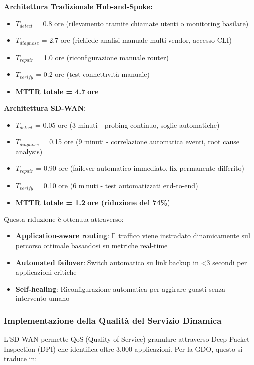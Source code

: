\textbf{Architettura Tradizionale Hub-and-Spoke:}
\begin{itemize}
    \item $T_{detect}$ = 0.8 ore (rilevamento tramite chiamate utenti o monitoring basilare)
    \item $T_{diagnose}$ = 2.7 ore (richiede analisi manuale multi-vendor, accesso CLI)
    \item $T_{repair}$ = 1.0 ore (riconfigurazione manuale router)
    \item $T_{verify}$ = 0.2 ore (test connettività manuale)
    \item \textbf{MTTR totale = 4.7 ore}
\end{itemize}

\textbf{Architettura SD-WAN:}
\begin{itemize}
    \item $T_{detect}$ = 0.05 ore (3 minuti - probing continuo, soglie automatiche)
    \item $T_{diagnose}$ = 0.15 ore (9 minuti - correlazione automatica eventi, root cause analysis)
    \item $T_{repair}$ = 0.90 ore (failover automatico immediato, fix permanente differito)
    \item $T_{verify}$ = 0.10 ore (6 minuti - test automatizzati end-to-end)
    \item \textbf{MTTR totale = 1.2 ore (riduzione del 74\%)}
\end{itemize}

Questa riduzione è ottenuta attraverso:
\begin{itemize}
    \item \textbf{Application-aware routing}: Il traffico viene instradato dinamicamente sul percorso ottimale basandosi su metriche real-time
    \item \textbf{Automated failover}: Switch automatico su link backup in <3 secondi per applicazioni critiche
    \item \textbf{Self-healing}: Riconfigurazione automatica per aggirare guasti senza intervento umano
\end{itemize}

\subsubsection{\texorpdfstring{\textbf{Implementazione della Qualità del Servizio Dinamica}}{3.3.1.3 - Implementazione della Qualità del Servizio Dinamica}}

L'SD-WAN permette QoS (Quality of Service) granulare attraverso Deep Packet Inspection (DPI) che identifica oltre 3.000 applicazioni. Per la GDO, questo si traduce in:

